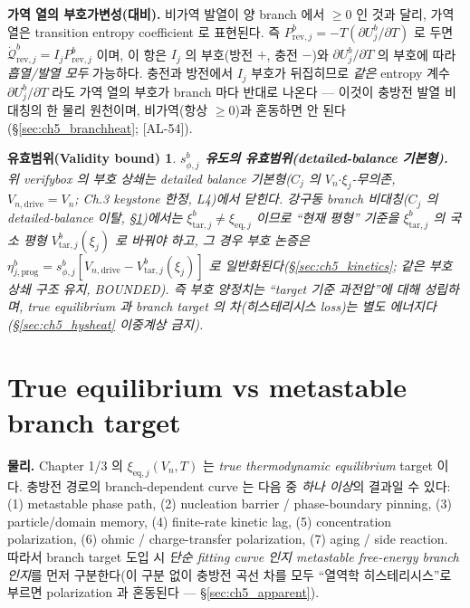 \documentclass[11pt,a4paper]{article}
\newtheorem*{boundbox}{유효범위(Validity bound)}
\newcommand{\eq}{\mathrm{eq}}
\newcommand{\drive}{\mathrm{drive}}
\newcommand{\rev}{\mathrm{rev}}
\newcommand{\prog}{\mathrm{prog}}
\newcommand{\tar}{\mathrm{tar}}
\newcommand{\AL}[1]{\textsf{[AL-#1]}}
\begin{document}
\textbf{가역 열의 부호가변성(대비).} 비가역 발열이 양 branch 에서 $\ge0$ 인 것과 달리, 가역 열은
transition entropy coefficient 로 표현된다. 즉 $P_{\rev,j}^b=-T(\partial U_j^b/\partial T)$ 로 두면
$\dot{\mathcal Q}_{\rev,j}^b=I_jP_{\rev,j}^b$ 이며, 이 항은 $I_j$ 의 부호(방전 $+$, 충전 $-$)와
$\partial U_j^b/\partial T$ 의 부호에 따라 \emph{흡열/발열 모두} 가능하다. 충전과 방전에서 $I_j$ 부호가
뒤집히므로 \emph{같은} entropy 계수 $\partial U_j^b/\partial T$ 라도 가역 열의 부호가 branch 마다 반대로 나온다
— 이것이 충방전 발열 비대칭의 한 물리 원천이며, 비가역(항상 $\ge0$)과 혼동하면 안 된다(\S\ref{sec:ch5_branchheat};
\AL{54}).

\begin{boundbox}
\textbf{$s_{\phi,j}^b$ 유도의 유효범위(detailed-balance 기본형).} 위 verifybox 의 부호 상쇄는 \emph{detailed
balance 기본형}($C_j$ 의 $V_n$$\cdot$$\xi_j$-무의존, $V_{n,\drive}=V_n$; Ch.3 keystone 한정, L4)에서 닫힌다.
강구동 branch 비대칭($C_j$ 의 detailed-balance 이탈, \S\ref{sec:ch5_branch})에서는 $\xi_{\tar,j}^b\ne\xi_{\eq,j}$
이므로 ``현재 평형'' 기준을 $\xi_{\tar,j}^b$ 의 국소 평형 $V_{\tar,j}^b(\xi_j)$ 로 바꿔야 하고, 그 경우 부호
논증은 $\eta_{j,\prog}^b=s_{\phi,j}^b[V_{n,\drive}-V_{\tar,j}^b(\xi_j)]$ 로 일반화된다(\S\ref{sec:ch5_kinetics};
같은 부호 상쇄 구조 유지, BOUNDED). 즉 부호 양정치는 ``target 기준 과전압''에 대해 성립하며, true equilibrium
과 branch target 의 차(히스테리시스 loss)는 \emph{별도} 에너지다(\S\ref{sec:ch5_hysheat} 이중계상 금지).
\end{boundbox}

\section{True equilibrium vs metastable branch target}\label{sec:ch5_branch}
\textbf{물리.} Chapter 1/3 의 $\xi_{\eq,j}(V_n,T)$ 는 \emph{true thermodynamic equilibrium} target 이다.
충방전 경로의 branch-dependent curve 는 다음 중 \emph{하나 이상}의 결과일 수 있다: (1) metastable phase path,
(2) nucleation barrier / phase-boundary pinning, (3) particle/domain memory, (4) finite-rate kinetic lag,
(5) concentration polarization, (6) ohmic / charge-transfer polarization, (7) aging / side reaction. 따라서
branch target 도입 시 \emph{단순 fitting curve 인지 metastable free-energy branch 인지}를 먼저 구분한다(이
구분 없이 충방전 곡선 차를 모두 ``열역학 히스테리시스''로 부르면 polarization 과 혼동된다 —
\S\ref{sec:ch5_apparent}).
\end{document}
